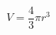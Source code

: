 \documentclass[14pt]{article}
\begin{document}
\pagestyle{empty}
\[ V = \frac{4}{3} \pi r^3 \]
\end{document}
